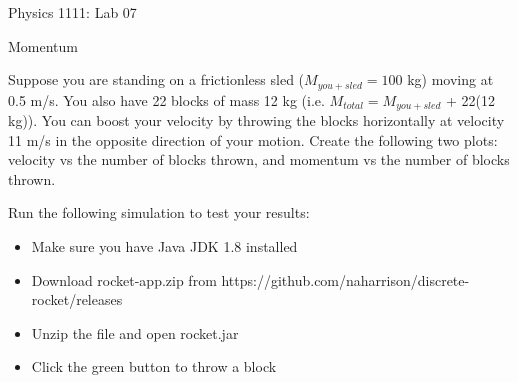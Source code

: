 \documentclass[12pt]{article}
\begin{document}
{\centering
\large Physics 1111: Lab 07 \par
\large Momentum \par
}
\hfill \break \vspace{-4mm}

Suppose you are standing on a frictionless sled ($M_{you+sled} = 100$ kg) moving at 0.5 m/s.
You also have 22 blocks of mass 12 kg (i.e. $M_{total} = M_{you+sled}$ + 22(12 kg)).
You can boost your velocity by throwing the blocks horizontally at velocity 11 m/s in the opposite direction of your motion.
Create the following two plots: velocity vs the number of blocks thrown, and momentum vs the number of blocks thrown.
\hfill \break

Run the following simulation to test your results:
\begin{itemize}
\item Make sure you have Java JDK 1.8 installed
\item Download rocket-app.zip from https://github.com/naharrison/discrete-rocket/releases
\item Unzip the file and open rocket.jar
\item Click the green button to throw a block
\end{itemize}
\end{document}
